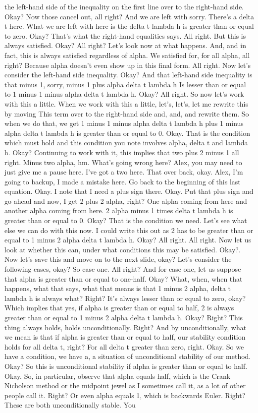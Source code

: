 \documentclass[10pt]{article}
\begin{document}
the left-hand side of the inequality on the first line over to the right-hand side. Okay? Now those cancel out, all right? And we are left with sorry. There's a delta t here. What we are left with here is the delta t lambda h is greater than or equal to zero. Okay? That's what the right-hand equalities says. All right. But this is always satisfied. Okay? All right? Let's look now at what happens. And, and in fact, this is always satisfied regardless of alpha. We satisfied for, for all alpha, all right? Because alpha doesn't even show up in this final form. All right. Now let's consider the left-hand side inequality. Okay? And that left-hand side inequality is that minus 1, sorry, minus 1 plus alpha delta t lambda h Is lesser than or equal to 1 minus 1 minus alpha delta t lambda h. Okay? All right. So now let's work with this a little. When we work with this a little, let's, let's, let me rewrite this by moving This term over to the right-hand side and, and, and rewrite them. So when we do that, we get 1 minus 1 minus alpha delta t lambda h plus 1 minus alpha delta t lambda h is greater than or equal to 0. Okay. That is the condition which must hold and this condition you note involves alpha, delta t and lambda h. Okay? Continuing to work with it, this implies that two plus 2 minus 1 all right. Minus two alpha, hm. What's going wrong here? Alex, you may need to just give me a pause here. I've got a two here. That over back, okay. Alex, I'm going to backup, I made a mistake here. Go back to the beginning of this last equation. Okay. I note that I need a plus sign there. Okay. Put that plus sign and go ahead and now, I get 2 plus 2 alpha, right? One alpha coming from here and another alpha coming from here. 2 alpha minus 1 times delta t lambda h is greater than or equal to 0. Okay? That is the condition we need. Let's see what else we can do with this now. I could write this out as 2 has to be greater than or equal to 1 minus 2 alpha delta t lambda h. Okay? All right. All right. Now let us look at whether this can, under what conditions this may be satisfied. Okay?. Now let's save this and move on to the next slide, okay? Let's consider the following cases, okay? So case one. All right? And for case one, let us suppose that alpha is greater than or equal to one-half. Okay? What, when, when that happens, what that says, what that means is that 1 minus 2 alpha, delta t lambda h is always what? Right? It's always lesser than or equal to zero, okay? Which implies that yes, if alpha is greater than or equal to half, 2 is always greater than or equal to 1 minus 2 alpha delta t lambda h. Okay? Right? This thing always holds, holds unconditionally. Right? And by unconditionally, what we mean is that if alpha is greater than or equal to half, our stability condition holds for all delta t, right? For all delta t greater than zero, right. Okay. So we have a condition, we have a, a situation of unconditional stability of our method. Okay? So this is unconditional stability if alpha is greater than or equal to half. Okay. So, in particular, observe that alpha equals half, which is the Crank Nicholson method or the midpoint jewel as I sometimes call it, as a lot of other people call it. Right? Or even alpha equals 1, which is backwards Euler. Right? These are both unconditionally stable. You 
\end{document}
